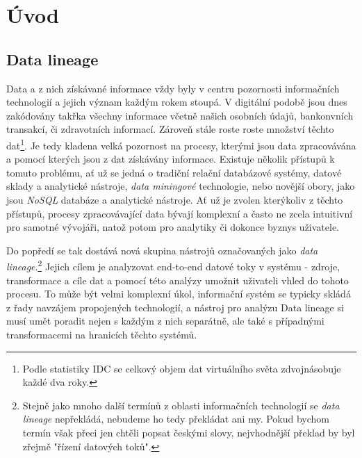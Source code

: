 \chapter{Úvod}
\label{sec:uvod}
\section{Data lineage}

Data a z nich získávané informace vždy byly v centru pozornosti informačních technologií a jejich význam každým rokem stoupá. V digitální podobě jsou dnes zakódovány takřka všechny informace včetně našich osobních údajů, bankonvních transakcí, či zdravotních informací. Zároveň stále roste roste množství těchto dat\footnote{Podle statistiky IDC \cite{Idc14} se celkový objem dat virtuálního světa zdvojnásobuje každé dva roky.}.
Je tedy kladena velká pozornost na procesy, kterými jsou data zpracovávána a pomocí kterých jsou z dat získávány informace. Existuje několik přístupů k tomuto problému, ať už se jedná o tradiční relační databázové systémy, datové sklady a \textit{} analytické nástroje, \textit{data miningové} technologie, nebo novější obory, jako jsou \textit{NoSQL} databáze a analytické nástroje. Ať už je zvolen kterýkoliv z těchto přístupů, procesy zpracovávající data bývají komplexní a často ne zcela intuitivní pro samotné vývojáři, natož potom pro analytiky či dokonce byznys uživatele.

Do popředí se tak dostává nová skupina nástrojů označovaných jako \textit{data lineage}.\footnote{Stejně jako mnoho další termínů z oblasti informačních technologií se \textit{data lineage} nepřekládá, nebudeme ho tedy překládat ani my. Pokud bychom termín však přeci jen chtěli popsat českými slovy, nejvhodnější překlad by byl zřejmě "řízení datových toků".}
Jejich cílem je analyzovat end-to-end datové toky v systému - zdroje, transformace a cíle dat a pomocí této analýzy umožnit uživateli vhled do tohoto procesu. To může být velmi komplexní úkol, informační systém se typicky skládá z řady navzájem propojených technologií, a nástroj pro analýzu Data lineage si musí umět poradit nejen s každým z nich separátně, ale také s případnými transformacemi na hranicích těchto systémů.

